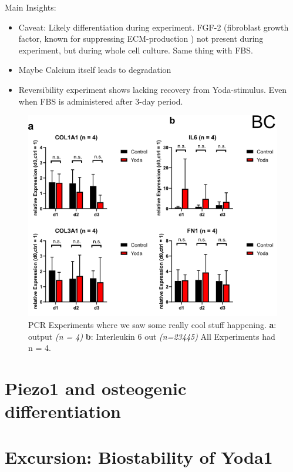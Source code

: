 Main Insights:
\begin{itemize}
     \item  Caveat: Likely differentiation during experiment. FGF-2 (fibroblast growth factor, known for suppressing ECM-production ) not present during experiment, but during whole cell culture. Same thing with FBS. 
     
     \item Maybe Calcium itself leads to degradation
    
    \item Reversibility experiment shows lacking recovery from Yoda-stimulus. Even when FBS is administered after 3-day period.
\end{itemize}



\begin{figure}[ht]
    \centering
    \includegraphics[scale = 0.6]{Collection.png}
    \caption{
    PCR Experiments where we saw some really cool stuff happening. 
    \textbf{a}: \colone output \textit{(n = 4)}
    \textbf{b}: Interleukin 6 out \textit{(n=23445)}
    All Experiments had n = 4. 
    }
    \label{fig:my_label}
\end{figure}

\section{Piezo1 and osteogenic differentiation}


\section{Excursion: Biostability of Yoda1}
\label{sec:biostability}